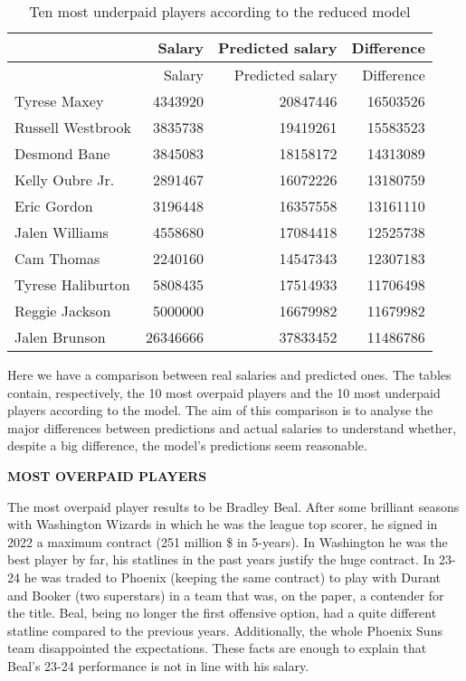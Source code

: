 \documentclass[
]{article}
\begin{document}
\begin{longtable}[]{@{}lrrr@{}}
\caption{Ten most underpaid players according to the reduced
model}\tabularnewline
\toprule()
& Salary & Predicted salary & Difference \\
\midrule()
\endfirsthead
\toprule()
& Salary & Predicted salary & Difference \\
\midrule()
\endhead
Tyrese Maxey & 4343920 & 20847446 & 16503526 \\
Russell Westbrook & 3835738 & 19419261 & 15583523 \\
Desmond Bane & 3845083 & 18158172 & 14313089 \\
Kelly Oubre Jr. & 2891467 & 16072226 & 13180759 \\
Eric Gordon & 3196448 & 16357558 & 13161110 \\
Jalen Williams & 4558680 & 17084418 & 12525738 \\
Cam Thomas & 2240160 & 14547343 & 12307183 \\
Tyrese Haliburton & 5808435 & 17514933 & 11706498 \\
Reggie Jackson & 5000000 & 16679982 & 11679982 \\
Jalen Brunson & 26346666 & 37833452 & 11486786 \\
\bottomrule()
\end{longtable}

Here we have a comparison between real salaries and predicted ones. The
tables contain, respectively, the 10 most overpaid players and the 10
most underpaid players according to the model. The aim of this
comparison is to analyse the major differences between predictions and
actual salaries to understand whether, despite a big difference, the
model's predictions seem reasonable.

\textbf{MOST OVERPAID PLAYERS}

The most overpaid player results to be Bradley Beal. After some
brilliant seasons with Washington Wizards in which he was the league top
scorer, he signed in 2022 a maximum contract (251 million \$ in
5-years). In Washington he was the best player by far, his statlines in
the past years justify the huge contract. In 23-24 he was traded to
Phoenix (keeping the same contract) to play with Durant and Booker (two
superstars) in a team that was, on the paper, a contender for the title.
Beal, being no longer the first offensive option, had a quite different
statline compared to the previous years. Additionally, the whole Phoenix
Suns team disappointed the expectations. These facts are enough to
explain that Beal's 23-24 performance is not in line with his salary.
\end{document}
